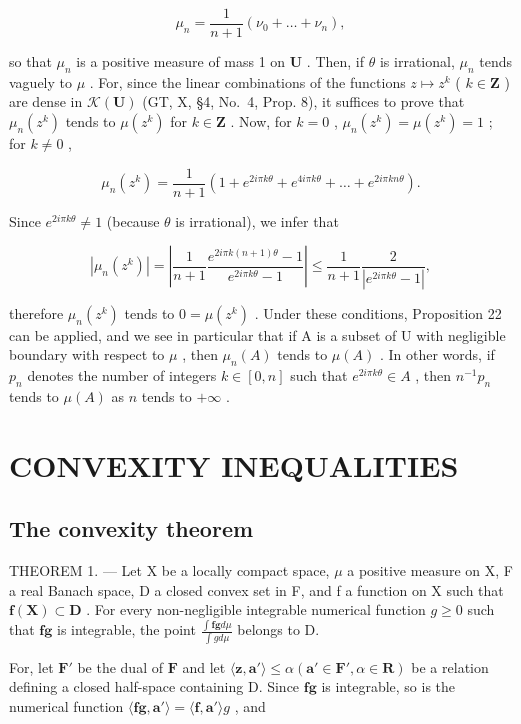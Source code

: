 \[
\mu_ {n} = \frac {1}{n + 1} (\nu_ {0} + \dots + \nu_ {n}),
\]

so that \(\mu_n\) is a positive measure of mass 1 on \(\mathbf{U}\) . Then, if \(\theta\) is irrational, \(\mu_n\) tends vaguely to \(\mu\) . For, since the linear combinations of the functions \(z \mapsto z^k\) ( \(k \in \mathbf{Z}\) ) are dense in \(\mathcal{K}(\mathbf{U})\) (GT, X, §4, No.~4, Prop. 8), it suffices to prove that \(\mu_n(z^k)\) tends to \(\mu(z^k)\) for \(k \in \mathbf{Z}\) . Now, for \(k = 0\) , \(\mu_n(z^k) = \mu(z^k) = 1\) ; for \(k \neq 0\) ,

\[
\mu_ {n} (z ^ {k}) = \frac {1}{n + 1} (1 + e ^ {2 i \pi k \theta} + e ^ {4 i \pi k \theta} + \dots + e ^ {2 i \pi k n \theta}).
\]

Since \(e^{2i\pi k\theta} \neq 1\) (because \(\theta\) is irrational), we infer that

\[
\left| \mu_ {n} (z ^ {k}) \right| = \left| \frac {1}{n + 1} \frac {e ^ {2 i \pi k (n + 1) \theta} - 1}{e ^ {2 i \pi k \theta} - 1} \right| \leqslant \frac {1}{n + 1} \frac {2}{\left| e ^ {2 i \pi k \theta} - 1 \right|},
\]

therefore \(\mu_n(z^k)\) tends to \(0 = \mu (z^k)\) . Under these conditions, Proposition 22 can be applied, and we see in particular that if A is a subset of U with negligible boundary with respect to \(\mu\) , then \(\mu_n(A)\) tends to \(\mu(A)\) . In other words, if \(p_n\) denotes the number of integers \(k \in [0, n]\) such that \(e^{2i\pi k\theta} \in A\) , then \(n^{-1}p_n\) tends to \(\mu(A)\) as \(n\) tends to \(+\infty\) .

\section{CONVEXITY INEQUALITIES}

\subsection{The convexity theorem}

THEOREM 1. --- Let X be a locally compact space, \(\mu\) a positive measure on X, F a real Banach space, D a closed convex set in F, and f a function on X such that \(\mathbf{f}(\mathbf{X}) \subset \mathbf{D}\) . For every non-negligible integrable numerical function \(g \geqslant 0\) such that \(\mathbf{fg}\) is integrable, the point \(\frac{\int \mathbf{fg} d\mu}{\int g d\mu}\) belongs to D.

For, let \(\mathbf{F}'\) be the dual of \(\mathbf{F}\) and let \(\langle \mathbf{z},\mathbf{a}'\rangle \leqslant \alpha (\mathbf{a}'\in \mathbf{F}',\alpha \in \mathbf{R})\) be a relation defining a closed half-space containing D. Since \(\mathbf{fg}\) is integrable, so is the numerical function \(\langle \mathbf{fg},\mathbf{a}'\rangle = \langle \mathbf{f},\mathbf{a}'\rangle g\) , and

